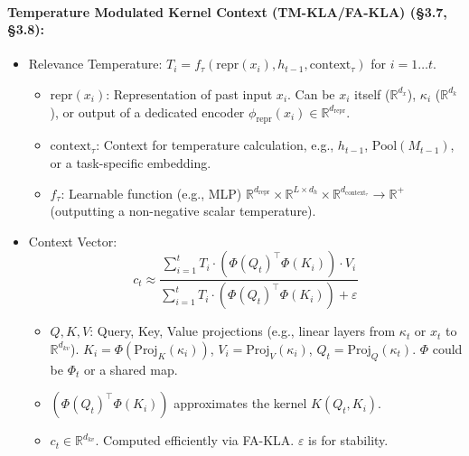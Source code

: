 \documentclass{article}
\begin{document}
\paragraph{Temperature Modulated Kernel Context (TM-KLA/FA-KLA) (\S3.7, \S3.8):}
\begin{itemize}
    \item Relevance Temperature: $T_i = f_\tau(\text{repr}(x_i), h_{t-1}, \text{context}_\tau)$ for $i=1\dots t$.
        \begin{itemize}
        \item $\text{repr}(x_i)$: Representation of past input $x_i$. Can be $x_i$ itself ($\mathbb{R}^{d_x}$), $\kappa_i$ ($\mathbb{R}^{d_k}$), or output of a dedicated encoder $\phi_{\text{repr}}(x_i) \in \mathbb{R}^{d_{\text{repr}}}$.
        \item $\text{context}_\tau$: Context for temperature calculation, e.g., $h_{t-1}$, $\text{Pool}(M_{t-1})$, or a task-specific embedding.
        \item $f_\tau$: Learnable function (e.g., MLP) $\mathbb{R}^{d_{\text{repr}}} \times \mathbb{R}^{L \times d_h} \times \mathbb{R}^{d_{\text{context}_\tau}} \to \mathbb{R}^+$ (outputting a non-negative scalar temperature).
        \end{itemize}
    \item Context Vector:
    \[
    c_t \approx \frac{\sum_{i=1}^t T_i \cdot (\Phi(Q_t)^\top \Phi(K_i)) \cdot V_i}{\sum_{i=1}^t T_i \cdot (\Phi(Q_t)^\top \Phi(K_i)) + \varepsilon}
    \]
        \begin{itemize}
        \item $Q, K, V$: Query, Key, Value projections (e.g., linear layers from $\kappa_t$ or $x_t$ to $\mathbb{R}^{d_{kv}}$). $K_i = \Phi(\text{Proj}_K(\kappa_i))$, $V_i = \text{Proj}_V(\kappa_i)$, $Q_t = \text{Proj}_Q(\kappa_t)$. $\Phi$ could be $\Phi_t$ or a shared map.
        \item $(\Phi(Q_t)^\top \Phi(K_i))$ approximates the kernel $K(Q_t, K_i)$.
        \item $c_t \in \mathbb{R}^{d_{kv}}$. Computed efficiently via FA-KLA. $\varepsilon$ is for stability.
        \end{itemize}
\end{itemize}
\end{document}
